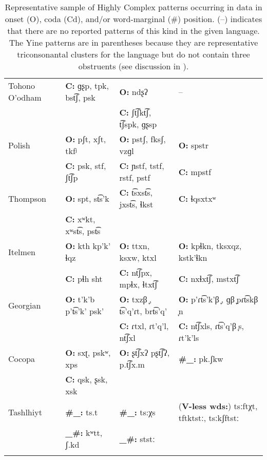 \begin{table}
\begin{tabular}{llll}
{Tohono O’odham} & \textbf{C:} ɡʂp, tpk, bst͡ʃ, psk & \textbf{O:} ndʂʔ & --\\
                & & \textbf{C:} ʃt͡ʃkt͡ʃ, t͡ʃspk, ɡʂsp\\
{Polish} & \textbf{O:} pʃt, xʃt, tkfʲ  & \textbf{O:} pstʃ, fksʃ, vzɡl  & \textbf{O:} spstr \\
            & \textbf{C:} psk, stf, ʃt͡ʃp & \textbf{C:} ɲstf, tstf, rstf, pstf & \textbf{C:} mpstf\\
{Thompson} & \textbf{O:} spt, st͡s’k  & \textbf{C:} t͡sxst͡s, jxst͡s, ɬkst & \textbf{C:} ɬqsxtxʷ\\
           & \textbf{C:} xʷkt, xʷst͡s, pst͡s\\
{Itelmen} & \textbf{O:} kth kp'k' ɬqz  & \textbf{O:} ttxn, ksxw, ktxl  & \textbf{O:} kpɬkn, tksxqz, kstk’ɬkn \\
            & \textbf{C:} pɬh sht & \textbf{C:} nt͡ʃpx, mpɬx, ɬtxt͡ʃ & \textbf{C:} nxɬxt͡ʃ, mstxt͡ʃ\\
{Georgian} & \textbf{O:} t'k'b p't͡s'k' psk’ & \textbf{O:} txzβ ̞, t͡s’q’ɾt, brt͡s'q{}'  & \textbf{O:} p’ɾt͡s’k’β ̞, ɡβ ̞pɾt͡skβ ̞n \\
            & & \textbf{C:} ɾtxl, ɾt'q'l, nt͡ʃxl & \textbf{C:} nt͡ʃxls, ɾt͡s’q’β ̞s, ɾt'k'ls\\
{Cocopa} & \textbf{O:} sxʈ, pskʷ, xps  & \textbf{O:} ʂt͡ʃxʔ pʂt͡ʃʔ, p.t͡ʃx.m & \textbf{\#\_:} pk.ʃkw\\
            & \textbf{C:} qsk, ʂsk, xsk \\
{Tashlhiyt} & \textbf{\#\_:} ts.t  & \textbf{\#\_:} ts:χs  & (\textbf{V-less wds:}) tsːftχt, tftktstː, tsːkʃftstː\\
            & \textbf{\_\#:} kʷtt, ʃ.kd & \textbf{\_\#:} ststː \\
\lspbottomrule
\end{tabular}
\caption{\label{tab:3.12}Representative sample of Highly Complex patterns occurring in data in onset (O), coda (Cd), and/or word-marginal (\#) position. (--) indicates that there are no reported patterns of this kind in the given language. The Yine patterns are in parentheses because they are representative triconsonantal clusters for the language but do not contain three obstruents (see discussion in ).}
\end{table}

